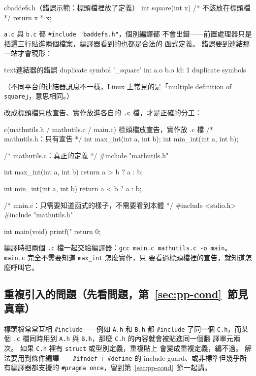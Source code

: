 \begin{code}{c}{baddefs.h（錯誤示範：標頭檔裡放了定義）}
int square(int x) {   /* 不該放在標頭檔 */
    return x * x;
}
\end{code}

\texttt{a.c} 與 \texttt{b.c} 都 \texttt{\#include "baddefs.h"}，個別編譯都
不會出錯——前置處理器只是把這三行貼進兩個檔案，編譯器看到的也都是合法的
函式定義。 錯誤要到連結那一站才會現形：

\begin{code}{text}{連結器的錯誤}
duplicate symbol '_square' in:
    a.o
    b.o
ld: 1 duplicate symbols
\end{code}

（不同平台的連結器訊息不一樣，Linux 上常見的是「multiple definition of
\texttt{square}」，意思相同。）

改成標頭檔只放宣告、實作放進各自的 \texttt{.c} 檔，才是正確的分工：

\begin{example}{c}{(mathutils.h / mathutils.c / main.c) 標頭檔放宣告，實作放 .c 檔}
/* mathutils.h：只有宣告 */
int max_int(int a, int b);
int min_int(int a, int b);

/* mathutils.c：真正的定義 */
#include "mathutils.h"

int max_int(int a, int b) {
    return a > b ? a : b;
}

int min_int(int a, int b) {
    return a < b ? a : b;
}

/* main.c：只需要知道函式的樣子，不需要看到本體 */
#include <stdio.h>
#include "mathutils.h"

int main(void) {
    printf("%
    return 0;
}
\end{example}


編譯時把兩個 \texttt{.c} 檔一起交給編譯器：\texttt{gcc main.c mathutils.c
-o main}。 \texttt{main.c} 完全不需要知道 \texttt{max\_int} 怎麼實作，只
要看過標頭檔裡的宣告，就知道怎麼呼叫它。

\subsection[重複引入的問題]{重複引入的問題（先看問題，第~\ref{sec:pp-cond}~節見真章）}

標頭檔常常互相 \texttt{\#include}——例如 \texttt{A.h} 和 \texttt{B.h} 都
\texttt{\#include} 了同一個 \texttt{C.h}，而某個 \texttt{.c} 檔同時用到
\texttt{A.h} 與 \texttt{B.h}，那麼 \texttt{C.h} 的內容就會被貼進同一個翻
譯單元兩次。 如果 \texttt{C.h} 裡有 \texttt{struct} 或型別定義，重複貼上
會變成重複定義，編不過。 解法要用到條件編譯——\texttt{\#ifndef} +
\texttt{\#define} 的 include guard、或非標準但幾乎所有編譯器都支援的
\texttt{\#pragma once}，留到第~\ref{sec:pp-cond}~節一起講。

